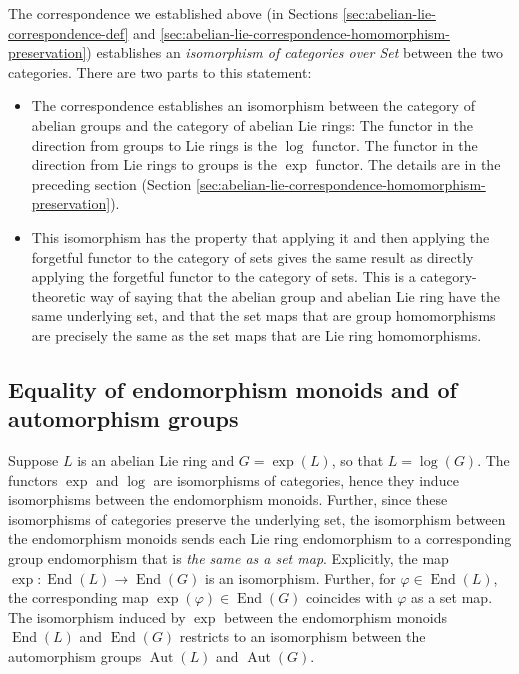 The correspondence we established above (in Sections
\ref{sec:abelian-lie-correspondence-def} and
\ref{sec:abelian-lie-correspondence-homomorphism-preservation})
establishes an {\em isomorphism of categories over Set} between the
two categories. There are two parts to this statement:

\begin{itemize}
\item The correspondence establishes an isomorphism between the
  category of abelian groups and the category of abelian Lie rings:
  The functor in the direction from groups to Lie rings is the $\log$
  functor. The functor in the direction from Lie rings to groups is
  the $\exp$ functor. The details are in the preceding section
  (Section
  \ref{sec:abelian-lie-correspondence-homomorphism-preservation}).
\item This isomorphism has the property that applying it and then
  applying the forgetful functor to the category of sets gives the
  same result as directly applying the forgetful functor to the
  category of sets. This is a category-theoretic way of saying that
  the abelian group and abelian Lie ring have the same underlying set,
  and that the set maps that are group homomorphisms are precisely the
  same as the set maps that are Lie ring homomorphisms.
\end{itemize}

\subsection{Equality of endomorphism monoids and of automorphism groups}\label{sec:abelian-lie-correspondence-aut-end}

Suppose $L$ is an abelian Lie ring and $G = \exp(L)$, so that $L =
\log(G)$. The functors $\exp$ and $\log$ are isomorphisms of
categories, hence they induce isomorphisms between the endomorphism
monoids. Further, since these isomorphisms of categories preserve the
underlying set, the isomorphism between the endomorphism monoids sends
each Lie ring endomorphism to a corresponding group endomorphism that
is {\em the same as a set map}. Explicitly, the map
$\exp:\operatorname{End}(L) \to \operatorname{End}(G)$ is an
isomorphism. Further, for $\varphi \in \operatorname{End}(L)$, the
corresponding map $\exp(\varphi) \in \operatorname{End}(G)$ coincides
with $\varphi$ as a set map. The isomorphism induced by $\exp$ between
the endomorphism monoids $\operatorname{End}(L)$ and
$\operatorname{End}(G)$ restricts to an isomorphism between the
automorphism groups $\operatorname{Aut}(L)$ and
$\operatorname{Aut}(G)$.

